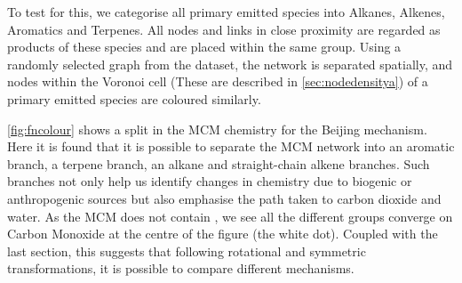 To test for this, we categorise all primary emitted species into Alkanes, Alkenes, Aromatics and Terpenes. All nodes and links in close proximity are regarded as products of these species and are placed within the same group. Using a randomly selected graph from the dataset, the network is separated spatially, and nodes within the Voronoi cell (These are described in \autoref{sec:nodedensitya}) of a primary emitted species are coloured similarly.

\autoref{fig:fncolour} shows a split in the MCM chemistry for the Beijing mechanism. Here it is found that it is possible to separate the MCM network into an aromatic branch, a terpene branch, an alkane and straight-chain alkene branches. Such branches not only help us identify changes in chemistry due to biogenic or anthropogenic sources but also emphasise the path taken to carbon dioxide and water. As the MCM does not contain , we see all the different groups converge on Carbon Monoxide at the centre of the figure (the white dot). Coupled with the last section, this suggests that following rotational and symmetric transformations, it is possible to compare different mechanisms.

